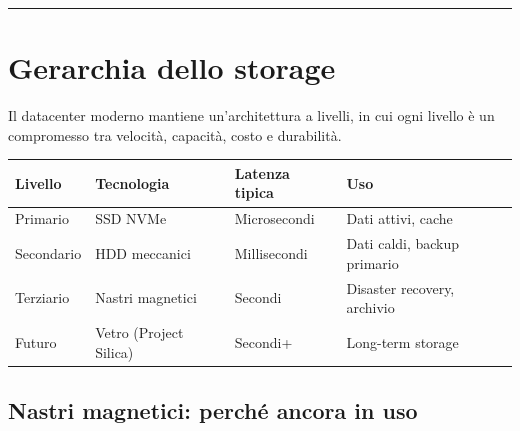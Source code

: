 \documentclass[
  italian,
  openany]{book}
\newcounter{none} %
\begin{document}
\begin{center}\rule{0.5\linewidth}{0.5pt}\end{center}

\section{Gerarchia dello storage}\label{gerarchia-dello-storage}

Il datacenter moderno mantiene un'architettura a livelli, in cui ogni
livello è un compromesso tra velocità, capacità, costo e durabilità.

{\def\LTcaptype{none} %
\begin{longtable}[]{@{}
  >{\raggedright\arraybackslash}p{}
  >{\raggedright\arraybackslash}p{}
  >{\raggedright\arraybackslash}p{}
  >{\raggedright\arraybackslash}p{}@{}}
\toprule\noalign{}
\begin{minipage}[b]{\linewidth}\raggedright
Livello
\end{minipage} & \begin{minipage}[b]{\linewidth}\raggedright
Tecnologia
\end{minipage} & \begin{minipage}[b]{\linewidth}\raggedright
Latenza tipica
\end{minipage} & \begin{minipage}[b]{\linewidth}\raggedright
Uso
\end{minipage} \\
\midrule\noalign{}
\endhead
\bottomrule\noalign{}
\endlastfoot
Primario & SSD NVMe & Microsecondi & Dati attivi, cache \\
Secondario & HDD meccanici & Millisecondi & Dati caldi, backup
primario \\
Terziario & Nastri magnetici & Secondi & Disaster recovery, archivio \\
Futuro & Vetro (Project Silica) & Secondi+ & Long-term storage \\
\end{longtable}
}

\subsection{Nastri magnetici: perché ancora in
uso}\label{nastri-magnetici-perchuxe9-ancora-in-uso}
\end{document}
